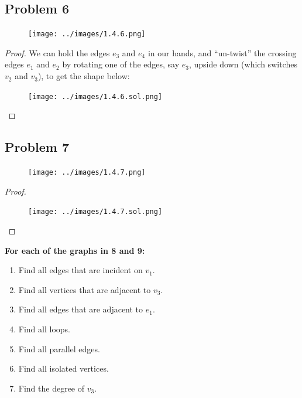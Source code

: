 \documentclass[14pt]{extarticle}
\begin{document}
\subsection{Problem 6}
\begin{figure}[ht!]
    \centering
    \texttt{[image: ../images/1.4.6.png]}
\end{figure}


\begin{proof}
    We can hold the edges $e_3$ and $e_4$ in our hands, and ``un-twist'' the
    crossing edges $e_1$ and $e_2$ by rotating one of the edges, say $e_3$, upside
    down (which switches $v_2$ and $v_3$), to get the shape below:

    \begin{figure}[ht!]
        \centering
        \texttt{[image: ../images/1.4.6.sol.png]}
    \end{figure}

\end{proof}

\subsection{Problem 7}

\begin{figure}[ht!]
    \centering
    \texttt{[image: ../images/1.4.7.png]}
\end{figure}

\begin{proof}

    \begin{figure}[ht!]
        \centering
        \texttt{[image: ../images/1.4.7.sol.png]}
    \end{figure}

\end{proof}

{\bf For each of the graphs in 8 and 9:}
\begin{enumerate}
    \item Find all edges that are incident on $v_1$.
    \item Find all vertices that are adjacent to $v_3$.
    \item Find all edges that are adjacent to $e_1$.
    \item Find all loops.
    \item Find all parallel edges.
    \item Find all isolated vertices.
    \item Find the degree of $v_3$.
\end{enumerate}
\end{document}
